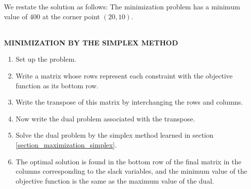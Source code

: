 We restate the solution as follows:
The minimization problem has a minimum value of 400 at the corner point $(20, 10)$.

\begin{summarybox}
    ~\\
    \textbf{MINIMIZATION BY THE SIMPLEX METHOD}
    \begin{enumerate}
        \item Set up the problem.
        \item Write a matrix whose rows represent each constraint with the objective function as its bottom row.
        \item Write the transpose of this matrix by interchanging the rows and columns.
        \item Now write the dual problem associated with the transpose.
        \item Solve the dual problem by the simplex method learned in section \ref{section_maximization_simplex}.
        \item The optimal solution is found in the bottom row of the final matrix in the columns corresponding to the slack variables, and the minimum value of the objective function is the same as the maximum value of the dual.
    \end{enumerate}
\end{summarybox}
